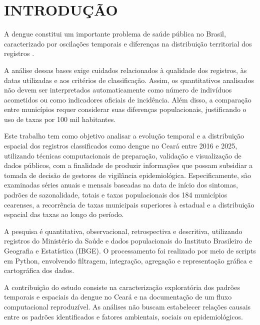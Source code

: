
\begingroup
\let\clearpage\relax
\chapter{INTRODUÇÃO}\label{sec:introducao}
\endgroup


A dengue constitui um importante problema de saúde pública no Brasil, caracterizado por oscilações temporais e diferenças na distribuição territorial dos registros \cite{OMS2025,Brasil2024Dengue}.

A análise dessas bases exige cuidados relacionados à qualidade dos registros, às datas utilizadas e aos critérios de classificação. Assim, os quantitativos analisados não devem ser interpretados automaticamente como número de indivíduos acometidos ou como indicadores oficiais de incidência. Além disso, a comparação entre municípios requer considerar suas diferenças populacionais, justificando o uso de taxas por 100 mil habitantes.


Este trabalho tem como objetivo analisar a evolução temporal e a distribuição espacial dos registros classificados como dengue no Ceará entre 2016 e 2025, utilizando técnicas computacionais de preparação, validação e visualização de dados públicos, com a finalidade de produzir informações que possam subsidiar a tomada de decisão de gestores de vigilância epidemiológica. Especificamente, são examinadas séries anuais e mensais baseadas na data de início dos sintomas, padrões de sazonalidade, totais e taxas populacionais dos 184 municípios cearenses, a recorrência de taxas municipais superiores à estadual e a distribuição espacial das taxas ao longo do período.

A pesquisa é quantitativa, observacional, retrospectiva e descritiva, utilizando registros do Ministério da Saúde e dados populacionais do Instituto Brasileiro de Geografia e Estatística (IBGE). O processamento foi realizado por meio de scripts em Python, envolvendo filtragem, integração, agregação e representação gráfica e cartográfica dos dados.

A contribuição do estudo consiste na caracterização exploratória dos padrões temporais e espaciais da dengue no Ceará e na documentação de um fluxo computacional reproduzível. As análises não buscam estabelecer relações causais entre os padrões identificados e fatores ambientais, sociais ou epidemiológicos.
